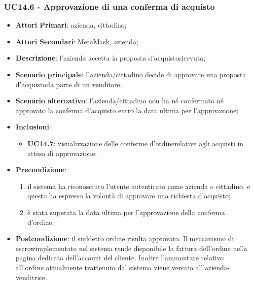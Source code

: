 \subsubsection{UC14.6 - Approvazione di una conferma di acquisto}
\begin{itemize}
	\item \textbf{Attori Primari}: azienda, cittadino;
	\item \textbf{Attori Secondari}: MetaMask\glo, azienda;
	\item \textbf{Descrizione}: l'azienda accetta la proposta d'acquisto\glosp ricevuta;
	\item \textbf{Scenario principale}: l'azienda/cittadino decide di approvare una proposta d'acquisto\glosp da parte di un venditore;
	\item \textbf{Scenario alternativo}: l'azienda/cittadino non ha né confermato né approvato la conferma d'acquisto entro la data ultima per l'approvazione;
		\item \textbf{Inclusioni}: 
	\begin{itemize}
		\item \textbf{UC14.7}:  visualizzazione delle conferme d'ordine\glosp relative agli acquisti in attesa di approvazione;
	\end{itemize}
	\item \textbf{Precondizione}: 
	\begin{enumerate}[label=\alph*.]
		\item il sistema ha riconosciuto l'utente autenticato come azienda o cittadino, e questo ha espresso la volontà di approvare una richiesta d'acquisto;
		\item è stata superata la data ultima per l'approvazione della conferma d'ordine\glo;
	\end{enumerate}
	\item \textbf{Postcondizione}: il suddetto ordine risulta approvato. Il meccanismo di escrow\glosp implementato nel sistema rende disponibile la fattura dell'ordine nella pagina dedicata dell'account del cliente. Inoltre l'ammontare relativo all'ordine attualmente trattenuto dal sistema viene versato all'azienda-venditrice.
\end{itemize}


